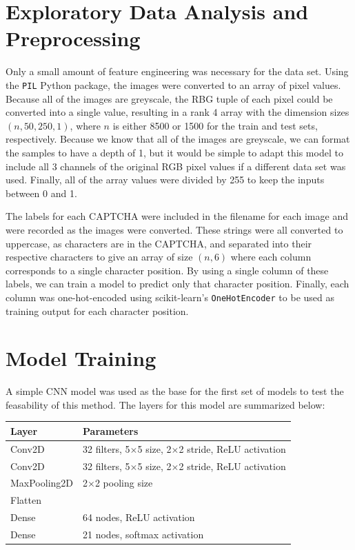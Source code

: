 \documentclass[12pt]{article}
\begin{document}
\section*{Exploratory Data Analysis and Preprocessing}


Only a small amount of feature engineering was necessary for the data set. Using
the \texttt{PIL} Python package, the images were converted to an array of pixel
values. Because all of the images are greyscale, the RBG tuple of each pixel
could be converted into a single value, resulting in a rank 4 array with the
dimension sizes $(n, 50, 250, 1)$, where $n$ is either 8500 or 1500 for the
train and test sets, respectively. Because we know that all of the images are
greyscale, we can format the samples to have a depth of 1, but it would be
simple to adapt this model to include all 3 channels of the original RGB pixel
values if a different data set was used. Finally, all of the array values were
divided by 255 to keep the inputs between 0 and 1.

The labels for each CAPTCHA were included in the filename for each image and
were recorded as the images were converted. These strings were all converted to
uppercase, as characters are in the CAPTCHA, and separated into their respective
characters to give an array of size $(n, 6)$ where each column corresponds to a
single character position. By using a single column of these labels, we can 
train a model to predict only that character position. Finally, each column was
one-hot-encoded using scikit-learn's \texttt{OneHotEncoder} to be used as
training output for each character position.

\section*{Model Training}


A simple CNN model was used as the base for the first set of models to test the
feasability of this method. The layers for this model are summarized below:

\begin{tabular}{ll}
    \toprule
	Layer        & Parameters \\
	\midrule
	Conv2D       & 32 filters, 5$\times$5 size, 2$\times$2 stride, ReLU
		activation  \\
	Conv2D       & 32 filters, 5$\times$5 size, 2$\times$2 stride, ReLU
		activation  \\
	MaxPooling2D & 2$\times$2 pooling size  \\
	Flatten      &   \\
	Dense        & 64 nodes, ReLU activation \\
	Dense        & 21 nodes, softmax activation \\
	\bottomrule
\end{tabular}
\end{document}
